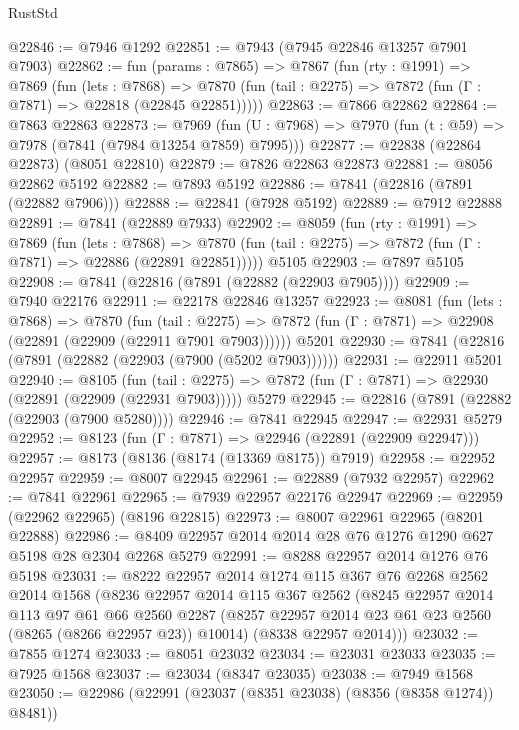 \begin{lexlean}{RustStd}
\begin{coremodule}
@22846 := @7946 @1292
@22851 := @7943 (@7945 @22846 @13257 @7901 @7903)
@22862 := fun (params : @7865) =>
  @7867
    (fun (rty : @1991) =>
    @7869
      (fun (lets : @7868) =>
      @7870 (fun (tail : @2275) => @7872 (fun (Γ : @7871) => @22818 (@22845 @22851)))))
@22863 := @7866 @22862
@22864 := @7863 @22863
@22873 := @7969
    (fun (U : @7968) => @7970 (fun (t : @59) => @7978 (@7841 (@7984 @13254 @7859) @7995)))
@22877 := @22838 (@22864 @22873) (@8051 @22810)
@22879 := @7826 @22863 @22873
@22881 := @8056 @22862 @5192
@22882 := @7893 @5192
@22886 := @7841 (@22816 (@7891 (@22882 @7906)))
@22888 := @22841 (@7928 @5192)
@22889 := @7912 @22888
@22891 := @7841 (@22889 @7933)
@22902 := @8059
    (fun (rty : @1991) =>
    @7869
      (fun (lets : @7868) =>
      @7870 (fun (tail : @2275) => @7872 (fun (Γ : @7871) => @22886 (@22891 @22851)))))
    @5105
@22903 := @7897 @5105
@22908 := @7841 (@22816 (@7891 (@22882 (@22903 @7905))))
@22909 := @7940 @22176
@22911 := @22178 @22846 @13257
@22923 := @8081
    (fun (lets : @7868) =>
    @7870
      (fun (tail : @2275) =>
      @7872 (fun (Γ : @7871) => @22908 (@22891 (@22909 (@22911 @7901 @7903))))))
    @5201
@22930 := @7841 (@22816 (@7891 (@22882 (@22903 (@7900 (@5202 @7903))))))
@22931 := @22911 @5201
@22940 := @8105
    (fun (tail : @2275) => @7872 (fun (Γ : @7871) => @22930 (@22891 (@22909 (@22931 @7903)))))
    @5279
@22945 := @22816 (@7891 (@22882 (@22903 (@7900 @5280))))
@22946 := @7841 @22945
@22947 := @22931 @5279
@22952 := @8123 (fun (Γ : @7871) => @22946 (@22891 (@22909 @22947)))
@22957 := @8173 (@8136 (@8174 (@13369 @8175)) @7919)
@22958 := @22952 @22957
@22959 := @8007 @22945
@22961 := @22889 (@7932 @22957)
@22962 := @7841 @22961
@22965 := @7939 @22957 @22176 @22947
@22969 := @22959 (@22962 @22965) (@8196 @22815)
@22973 := @8007 @22961 @22965 (@8201 @22888)
@22986 := @8409 @22957 @2014 @2014 @28 @76 @1276 @1290 @627 @5198 @28 @2304 @2268 @5279
@22991 := @8288 @22957 @2014 @1276 @76 @5198
@23031 := @8222
    @22957
    @2014
    @1274
    @115
    @367
    @76
    @2268
    @2562
    @2014
    @1568
    (@8236
      @22957
      @2014
      @115
      @367
      @2562
      (@8245
        @22957
        @2014
        @113
        @97
        @61
        @66
        @2560
        @2287
        (@8257 @22957 @2014 @23 @61 @23 @2560 (@8265 (@8266 @22957 @23)) @10014)
        (@8338 @22957 @2014)))
@23032 := @7855 @1274
@23033 := @8051 @23032
@23034 := @23031 @23033
@23035 := @7925 @1568
@23037 := @23034 (@8347 @23035)
@23038 := @7949 @1568
@23050 := @22986
    (@22991 (@23037 (@8351 @23038) (@8356 (@8358 @1274)) @8481))

\end{coremodule}
\end{lexlean}

